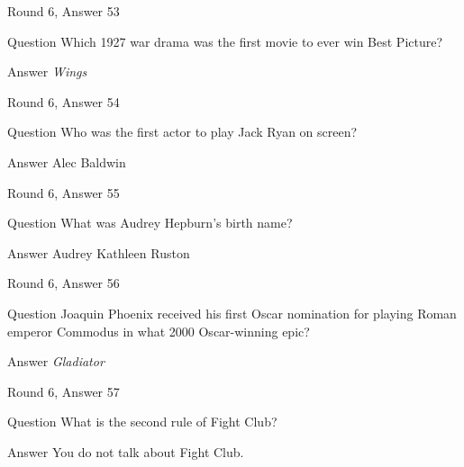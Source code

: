 \documentclass[11pt]{beamer}
\begin{document}
\begin{frame}[t]{Round 6, Answer 53}
\vspace{2em}
\begin{block}{Question}
Which 1927 war drama was the first movie to ever win Best Picture?
\end{block}
\pause{}
\begin{block}{Answer}
\emph{Wings}
\end{block}
\end{frame}
    

\begin{frame}[t]{Round 6, Answer 54}
\vspace{2em}
\begin{block}{Question}
Who was the first actor to play Jack Ryan on screen?
\end{block}
\pause{}
\begin{block}{Answer}
Alec Baldwin
\end{block}
\end{frame}
    

\begin{frame}[t]{Round 6, Answer 55}
\vspace{2em}
\begin{block}{Question}
What was Audrey Hepburn's birth name?
\end{block}
\pause{}
\begin{block}{Answer}
Audrey Kathleen Ruston
\end{block}
\end{frame}
    

\begin{frame}[t]{Round 6, Answer 56}
\vspace{2em}
\begin{block}{Question}
Joaquin Phoenix received his first Oscar nomination for playing Roman emperor Commodus in what 2000 Oscar-winning epic?
\end{block}
\pause{}
\begin{block}{Answer}
\emph{Gladiator}
\end{block}
\end{frame}
    

\begin{frame}[t]{Round 6, Answer 57}
\vspace{2em}
\begin{block}{Question}
What is the second rule of Fight Club?
\end{block}
\pause{}
\begin{block}{Answer}
You do not talk about Fight Club.
\end{block}
\end{frame}
    
\end{document}
